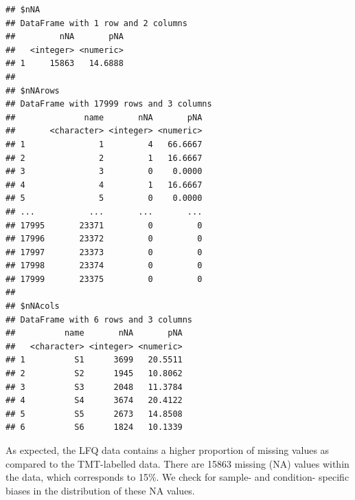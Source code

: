 \documentclass[9pt,a4paper,]{extarticle}
\newenvironment{Shaded}{\begin{snugshade}}{\end{snugshade}}
\newcommand{\AttributeTok}[1]{\textcolor[rgb]{0.77,0.63,0.00}{#1}}
\newcommand{\DecValTok}[1]{\textcolor[rgb]{0.00,0.00,0.81}{#1}}
\newcommand{\DocumentationTok}[1]{\textcolor[rgb]{0.56,0.35,0.01}{\textbf{\textit{#1}}}}
\newcommand{\FloatTok}[1]{\textcolor[rgb]{0.00,0.00,0.81}{#1}}
\newcommand{\FunctionTok}[1]{\textcolor[rgb]{0.00,0.00,0.00}{#1}}
\newcommand{\NormalTok}[1]{#1}
\newcommand{\SpecialCharTok}[1]{\textcolor[rgb]{0.00,0.00,0.00}{#1}}
\newcommand{\StringTok}[1]{\textcolor[rgb]{0.31,0.60,0.02}{#1}}
\begin{document}
\begin{verbatim}
## $nNA
## DataFrame with 1 row and 2 columns
##         nNA       pNA
##   <integer> <numeric>
## 1     15863   14.6888
## 
## $nNArows
## DataFrame with 17999 rows and 3 columns
##              name       nNA       pNA
##       <character> <integer> <numeric>
## 1               1         4   66.6667
## 2               2         1   16.6667
## 3               3         0    0.0000
## 4               4         1   16.6667
## 5               5         0    0.0000
## ...           ...       ...       ...
## 17995       23371         0         0
## 17996       23372         0         0
## 17997       23373         0         0
## 17998       23374         0         0
## 17999       23375         0         0
## 
## $nNAcols
## DataFrame with 6 rows and 3 columns
##          name       nNA       pNA
##   <character> <integer> <numeric>
## 1          S1      3699   20.5511
## 2          S2      1945   10.8062
## 3          S3      2048   11.3784
## 4          S4      3674   20.4122
## 5          S5      2673   14.8508
## 6          S6      1824   10.1339
\end{verbatim}

As expected, the LFQ data contains a higher proportion of missing values as
compared to the TMT-labelled data. There are 15863
missing (NA) values within the data, which corresponds to
15\%. We check for
sample- and condition- specific biases in the distribution of these NA values.

\begin{Shaded}
\end{Shaded}
\end{document}
